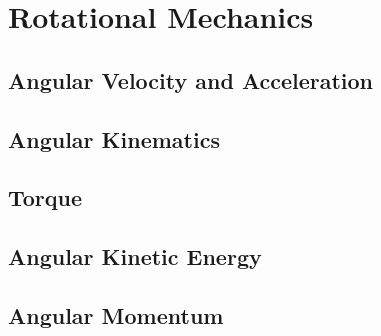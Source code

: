 \chapter{Rotational Mechanics}
	\section{Angular Velocity and Acceleration}
	\section{Angular Kinematics}
	\section{Torque}
	\section{Angular Kinetic Energy}
	\section{Angular Momentum}
	
	

		


	


